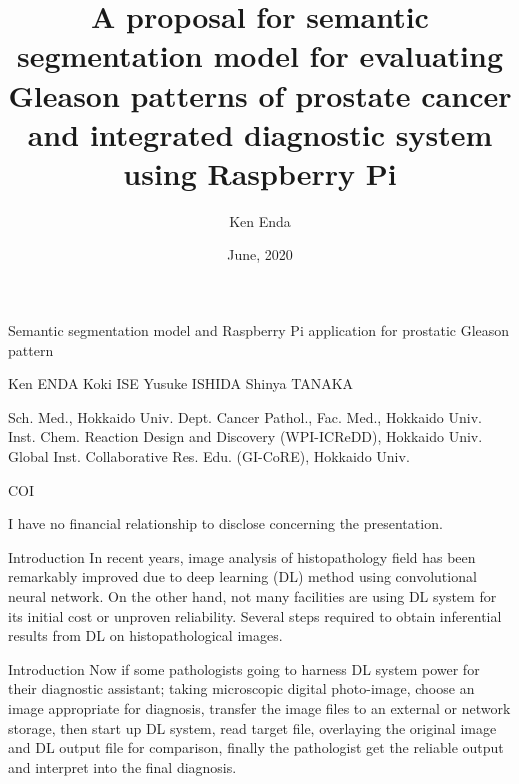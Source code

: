 \documentclass[
  dvipdfmx,
  xcolor={svgnames},
  hyperref={colorlinks,citecolor=DeepPink4,linkcolor=DarkRed,urlcolor=DarkBlue}
  ]{beamer}
\title{}
\title[Semantec segmentation model and Raspberry Pi application for prostatic Gleason pattern]{A proposal for semantic segmentation model for evaluating Gleason patterns of prostate cancer and integrated diagnostic system using Raspberry Pi}
\author{Ken Enda}
\institute{Department of Cancer Pathology Faculty of Medicine, HOKKAIDO UNIVERSITY}
\date[]{June, 2020}
\begin{document}
\nocite{*}

\begin{frame}{}
  \huge Semantic segmentation model and Raspberry Pi application for prostatic Gleason pattern\par
  \vspace{0.5zh}
  \small Ken ENDA \cite{student} Koki ISE\cite{student} Yusuke ISHIDA\cite{dept} Shinya TANAKA\cite{dept}\cite{icredd}\cite{gicore}
  \begin{thebibliography}{99}
    \beamertemplatetextbibitems
    \setlength{\itemsep}{-.5zw}
     Sch. Med., Hokkaido Univ.
     Dept. Cancer Pathol., Fac. Med., Hokkaido Univ.
     Inst. Chem. Reaction Design and Discovery (WPI-ICReDD), Hokkaido Univ.  
     Global Inst. Collaborative Res. Edu. (GI-CoRE), Hokkaido Univ.
  \end{thebibliography}
\end{frame}

\begin{frame}{COI}
  \begin{center}
    \setlength{\fboxsep}{1em}
    \par
    \vspace{1zh}
    I have no financial relationship to disclose concerning the presentation.
  \end{center}
\end{frame}

\begin{frame}{Introduction}
  In recent years, image analysis of histopathology field has been remarkably improved due to deep learning (DL) method using convolutional neural network. On the other hand, not many facilities are using DL system for its initial cost or unproven reliability. Several steps required to obtain inferential results from DL on histopathological images.
\end{frame}

\begin{frame}{Introduction}
  Now if some pathologists going to harness DL system power for their diagnostic assistant; taking microscopic digital photo-image, choose an image appropriate for diagnosis, transfer the image files to an external or network storage, then start up DL system, read target file, overlaying the original image and DL output file for comparison, finally the pathologist get the reliable output and interpret into the final diagnosis.
\end{frame}
\end{document}
